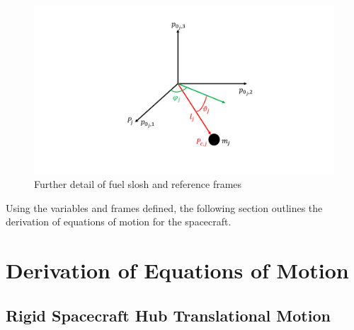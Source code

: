 \documentclass[]{BasiliskReportMemo}
\begin{document}
	\begin{figure}[ht]
		\centering

    	\includegraphics[width=13cm]{Figures/referencesystems.pdf}
        \caption{Further detail of fuel slosh and reference frames}
		\label{fig:Slosh_Detailed}
	\end{figure}
    
    Using the variables and frames defined, the following section outlines the derivation of equations of motion for the spacecraft.
	
	\section{Derivation of Equations of Motion}
	
	\subsection{Rigid Spacecraft Hub Translational Motion}
	
\end{document}
